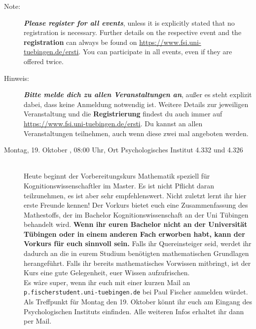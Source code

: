 \begin{description}
  \ifml
    \item[Note:] \textbf{\emph{Please register for all events}}, unless it is explicitly stated that no registration is necessary. Further details on the respective event and the \textbf{registration} can always be found on \url{https://www.fsi.uni-tuebingen.de/ersti}. You can participate in all events, even if they are offered twice.
  \else
    \item[Hinweis:] \textbf{\emph{Bitte melde dich zu allen Veranstaltungen an}}, außer es steht explizit dabei, dass keine Anmeldung notwendig ist. Weitere Details zur jeweiligen Veranstaltung und die \textbf{Registrierung} findest du auch immer auf \url{https://www.fsi.uni-tuebingen.de/ersti}. Du kannst an allen Veranstaltungen teilnehmen, auch wenn diese zwei mal angeboten werden.
  \fi

\ifkogwiss
    \ifmaster
        \item[Montag, 19. Oktober \YEAR, 08:00 Uhr, Ort Psychologisches Institut 4.332 und 4.326]\ \\
        Heute beginnt der Vorbereitungskurs Mathematik speziell für Kognitionswissenschaftler im Master. Es ist nicht Pflicht daran teilzunehmen, es ist aber sehr empfehlenswert. Nicht zuletzt lernt ihr hier erste Freunde kennen! Der Vorkurs bietet euch eine Zusammenfassung des Mathestoffs, der im Bachelor Kognitionswissenschaft an der Uni Tübingen behandelt wird.
        \textbf{Wenn ihr euren Bachelor nicht an der Universität Tübingen oder in einem anderen Fach erworben habt, kann der Vorkurs für euch sinnvoll sein.} Falls ihr Quereinsteiger seid, werdet ihr dadurch an die in eurem Studium benötigten mathematischen Grundlagen herangeführt. Falls ihr bereits mathematisches Vorwissen mitbringt, ist der Kurs eine gute Gelegenheit, euer Wissen aufzufrischen.\\
         Es wäre super, wenn ihr euch mit einer kurzen Mail an \texttt{p.fischer\At student.uni-tuebingen.de} bei Paul Fischer anmelden würdet. Als Treffpunkt für Montag den 19. Oktober könnt ihr euch am Eingang des Psychologischen Instituts einfinden. Alle weiteren Infos erhaltet ihr dann per Mail.\\

%
%
    \fi
\fi


\end{description}
